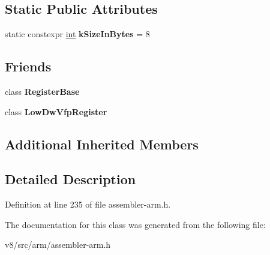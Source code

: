 \subsection*{Static Public Attributes}
\begin{DoxyCompactItemize}
\item 
\mbox{\label{classv8_1_1internal_1_1DwVfpRegister_a0b19fa9021fb2e9817cd6d5c6b030216}} 
static constexpr \mbox{\hyperlink{classint}{int}} {\bfseries k\+Size\+In\+Bytes} = 8
\end{DoxyCompactItemize}
\subsection*{Friends}
\begin{DoxyCompactItemize}
\item 
\mbox{\label{classv8_1_1internal_1_1DwVfpRegister_a762c32bfc1b920b5ead6f1c087b4a400}} 
class {\bfseries Register\+Base}
\item 
\mbox{\label{classv8_1_1internal_1_1DwVfpRegister_a61bfb148ee021003a4c5a099837ada6e}} 
class {\bfseries Low\+Dw\+Vfp\+Register}
\end{DoxyCompactItemize}
\subsection*{Additional Inherited Members}


\subsection{Detailed Description}


Definition at line 235 of file assembler-\/arm.\+h.



The documentation for this class was generated from the following file\+:\begin{DoxyCompactItemize}
\item 
v8/src/arm/assembler-\/arm.\+h\end{DoxyCompactItemize}

